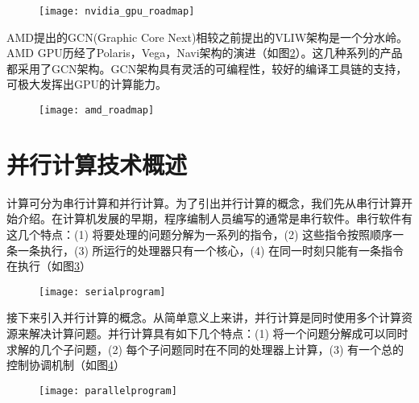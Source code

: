 \begin{figure}[!htbp]
	\centering
	\texttt{[image: nvidia\_gpu\_roadmap]}
	\label{fig:nvidia_gpu_roadmap}
\end{figure}

AMD提出的GCN(Graphic Core Next)相较之前提出的VLIW架构是一个分水岭。AMD GPU历经了Polaris，Vega，Navi架构的演进（如图\ref{fig:amd_roadmap}）。这几种系列的产品都采用了GCN架构。GCN架构具有灵活的可编程性，较好的编译工具链的支持，可极大发挥出GPU的计算能力。
\begin{figure}[!htbp]
	\centering
	\texttt{[image: amd\_roadmap]}
	\label{fig:amd_roadmap}
\end{figure}

\section{并行计算技术概述}
计算可分为串行计算和并行计算。为了引出并行计算的概念，我们先从串行计算开始介绍。在计算机发展的早期，程序编制人员编写的通常是串行软件。串行软件有这几个特点：(1) 将要处理的问题分解为一系列的指令，(2) 这些指令按照顺序一条一条执行，(3) 所运行的处理器只有一个核心，(4) 在同一时刻只能有一条指令在执行（如图\ref{fig:serialprogram}）

\begin{figure}[!htbp]
	\centering
	\texttt{[image: serialprogram]}
	\label{fig:serialprogram}
\end{figure}

接下来引入并行计算的概念。从简单意义上来讲，并行计算是同时使用多个计算资源来解决计算问题。并行计算具有如下几个特点：(1) 将一个问题分解成可以同时求解的几个子问题，(2) 每个子问题同时在不同的处理器上计算，(3) 有一个总的控制协调机制（如图\ref{fig:parallelprogram}）

\begin{figure}[!htbp]
	\centering
	\texttt{[image: parallelprogram]}
	\label{fig:parallelprogram}
\end{figure}

